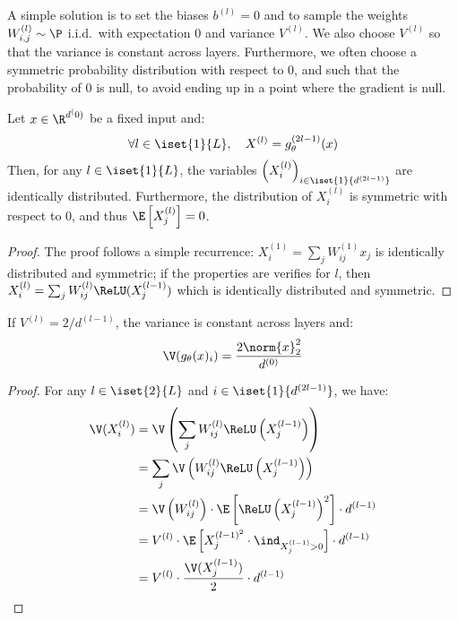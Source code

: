 A simple solution is to set the biases $b^{(l)}=0$ and to sample the weights $W_{i,j}^{(l)}\sim\P$ i.i.d.~with expectation $0$ and variance $V^{(l)}$. We also choose $V^{(l)}$ so that the variance is constant across layers. Furthermore, we often choose a symmetric probability distribution with respect to 0, and such that the probability of 0 is null, to avoid ending up in a point where the gradient is null.

\begin{lemma}
    Let $x\in\R^{d^(0)}$ be a fixed input and:
    \begin{equation}
        \forall l\in\iset{1}{L}, \quad X^{(l)}=g_\theta^{(2l-1)}(x)
    \end{equation}
    Then, for any $l\in\iset{1}{L}$, the variables $\left(X_i^{(l)}\right)_{i\in\iset{1}{d^{(2l-1)}}}$ are identically distributed. Furthermore, the distribution of $X_i^{(l)}$ is symmetric with respect to 0, and thus $\E\left[X_j^{(l)}\right]=0$.
\end{lemma}
\begin{proof}
    The proof follows a simple recurrence: $X_i^{(1)} = \sum_jW_{ij}^{(1)}x_j$ is identically distributed and symmetric; if the properties are verifies for $l$, then $X_i^{(l)} = \sum_jW_{ij}^{(l)}\ReLU(X_j^{(l-1)})$ which is identically distributed and symmetric.
\end{proof}

\begin{property}
    If $V^{(l)}=2/d^{(l-1)}$, the variance is constant across layers and:
    \begin{equation*}
        \V(g_\theta(x)_i) = \frac{2\norm{x}_2^2}{d^{(0)}}
    \end{equation*}
\end{property}
\begin{proof}
    For any $l\in\iset{2}{L}$ and $i\in\iset{1}{d^{(2l-1)}}$, we have:
    \begin{equation*}
        \begin{aligned}
            \V(X_i ^{(l)}) &= \V\left(\sum_jW_{ij}^{(l)}\ReLU\left(X_j^{(l-1)}\right)\right)\\
            &= \sum_j\V\left( W_{ij}^{(l)} \ReLU\left(X_j^{(l-1)}\right) \right)\\
            &= \V\left(W_{ij}^{(l)}\right) \cdot \E\left[\ReLU\left(X_j^{(l-1)}\right)^2\right] \cdot d^{(l-1)}\\
            &= V^{(l)} \cdot \E\left[X_j^{(l-1)^2} \cdot \ind_{X_j^{(l-1)}>0}\right] \cdot d^{(l-1)}\\
            &= V^{(l)} \cdot \frac{\V(X_j^{(l-1)})}{2} \cdot d^{(l-1)}
        \end{aligned}
    \end{equation*}
\end{proof}

